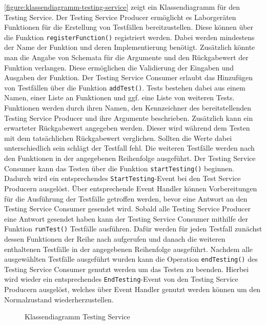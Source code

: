 \autoref{figure:klassendiagramm-testing-service} zeigt ein Klassendiagramm für den Testing Service. Der Testing Service Producer ermöglicht es Laborgeräten Funktionen für die Erstellung von Testfällen bereitzustellen. Diese können über die Funktion \texttt{registerFunction()} registriert werden. Dabei werden mindestens der Name der Funktion und deren Implementierung benötigt. Zusätzlich könnte man die Angabe von Schemata für die Argumente und den Rückgabewert der Funktion verlangen. Diese ermöglichen die Validierung der Eingaben und Ausgaben der Funktion. Der Testing Service Consumer erlaubt das Hinzufügen von Testfällen über die Funktion \texttt{addTest()}. Tests bestehen dabei aus einem Namen, einer Liste an Funktionen und ggf. eine Liste von weiteren Tests. Funktionen werden durch ihren Namen, den Kennzeichner des bereitstellenden Testing Service Producer und ihre Argumente beschrieben. Zusätzlich kann ein erwarteter Rückgabewert angegeben werden. Dieser wird während dem Testen mit dem tatsächlichen Rückgabewert verglichen. Sollten die Werte dabei unterschiedlich sein schlägt der Testfall fehl. Die weiteren Testfälle werden nach den Funktionen in der angegebenen Reihenfolge ausgeführt. Der Testing Service Consumer kann das Testen über die Funktion \texttt{startTesting()} beginnen. Dadurch wird ein entsprechendes \texttt{StartTesting}-Event bei den Test Service Producern ausgelöst. Über entsprechende Event Handler können Vorbereitungen für die Ausführung der Testfälle getroffen werden, bevor eine Antwort an den Testing Service Consumer gesendet wird. Sobald alle Testing Service Producer eine Antwort gesendet haben kann der Testing Service Consumer mithilfe der Funktion \texttt{runTest()} Testfälle ausführen. Dafür werden für jeden Testfall zunächst dessen Funktionen der Reihe nach aufgerufen und danach die weiteren enthaltenen Testfälle in der angegebenen Reihenfolge ausgeführt. Nachdem alle ausgewählten Testfälle ausgeführt wurden kann die Operation \texttt{endTesting()} des Testing Service Consumer genutzt werden um das Testen zu beenden. Hierbei wird wieder ein entsprechendes \texttt{EndTesting}-Event von den Testing Service Producern ausgelöst, welches über Event Handler genutzt werden können um den Normalzustand wiederherzustellen.

\begin{figure}[tbp]
    \centering
    \caption{Klassendiagramm Testing Service}
    \label{figure:klassendiagramm-testing-service}
\end{figure}

